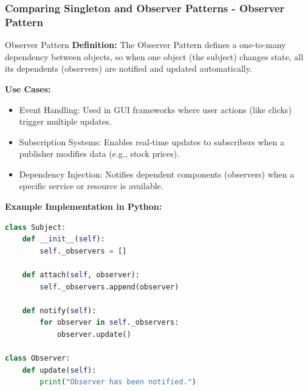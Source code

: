 \documentclass{beamer}
\begin{document}
\begin{frame}[fragile]
    \frametitle{Comparing Singleton and Observer Patterns - Observer Pattern}
    \begin{block}{Observer Pattern}
        \textbf{Definition:} The Observer Pattern defines a one-to-many dependency between objects, so when one object (the subject) changes state, 
        all its dependents (observers) are notified and updated automatically.
        
        \textbf{Use Cases:}
        \begin{itemize}
            \item Event Handling: Used in GUI frameworks where user actions (like clicks) trigger multiple updates.
            \item Subscription Systems: Enables real-time updates to subscribers when a publisher modifies data (e.g., stock prices).
            \item Dependency Injection: Notifies dependent components (observers) when a specific service or resource is available.
        \end{itemize}
        
        \textbf{Example Implementation in Python:}
        \begin{lstlisting}[language=Python]
class Subject:
    def __init__(self):
        self._observers = []

    def attach(self, observer):
        self._observers.append(observer)

    def notify(self):
        for observer in self._observers:
            observer.update()

class Observer:
    def update(self):
        print("Observer has been notified.")
        \end{lstlisting}
    \end{block}
\end{frame}
\end{document}
